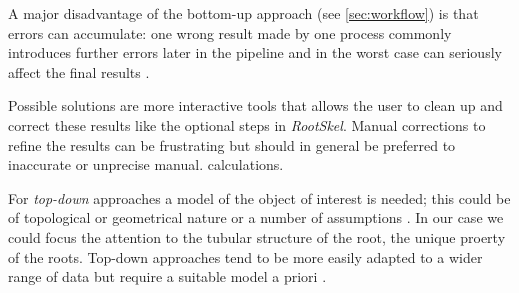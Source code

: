 A major disadvantage of the bottom-up approach (see \ref{sec:workflow}) is that errors can accumulate: one wrong result made by one process commonly introduces further errors later in the pipeline and in the worst case can seriously affect the final results \cite{pound2013rootnav}.

Possible solutions are more interactive tools that allows the user to clean up and correct these results \cite{armengaud2009ez,clark20113} like the optional steps in \textit{RootSkel}. Manual corrections to refine the results can be frustrating but should in general be preferred to inaccurate or unprecise manual. calculations.

For \textit{top-down} approaches a model of the object of interest is needed; this could be of topological or geometrical nature \cite{pound2012cellset} or a number of assumptions \cite{mooney2012developing}. In our case we could focus the attention to the tubular structure of the root, the unique proerty of the roots. Top-down approaches tend to be more easily adapted to a wider range of data but require a suitable model a priori  \cite{pound2013rootnav}.






